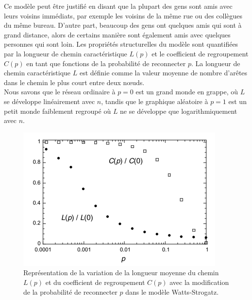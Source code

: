 Ce modèle peut être justifié en disant que la plupart des gens sont amis avec leurs voisins immédiats,  par exemple les voisins de la même rue ou des collègues du même bureau. D'autre part, beaucoup des gens ont quelques amis qui sont à grand distance, alors de certains manière sont également amis avec quelques personnes qui sont loin. Les propriétés structurelles du modèle sont quantifiées par la longueur de chemin caractéristique $L(p)$ et le coefficient de regroupement $C(p)$ en tant que fonctions de la probabilité de reconnecter $p$. La longueur de chemin caractéristique $L$ est définie comme la valeur moyenne de nombre d'arêtes dans le chemin le plus court entre deux nœuds.\\
Nous savons que le réseau ordinaire à $p=0$ est un grand monde en grappe, où $L$ se développe linéairement avec $n$, tandis que le graphique aléatoire à $p=1$ est un petit monde faiblement regroupé où $L$ ne se développe que logarithmiquement avec $n$. 
\begin{figure}[h!]
	\centering
	\includegraphics[scale=0.75]{./figures/SW2}
	\caption{Représentation de la variation de la longueur moyenne du chemin $L(p)$ et du coefficient de regroupement $C(p)$ avec la modification de la probabilité de reconnecter $p$ dans le modèle Watts-Strogatz.}  	
	\label{SW2}
\end{figure}


